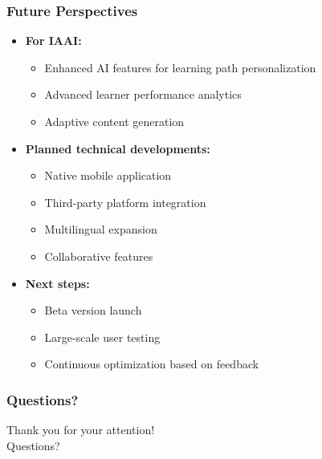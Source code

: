 \documentclass{beamer}
\begin{document}
\begin{frame}
\frametitle{Future Perspectives}
\begin{itemize}
    \item \textbf{For IAAI:}
    \begin{itemize}
        \item Enhanced AI features for learning path personalization
        \item Advanced learner performance analytics
        \item Adaptive content generation
    \end{itemize}
    \item \textbf{Planned technical developments:}
    \begin{itemize}
        \item Native mobile application
        \item Third-party platform integration
        \item Multilingual expansion
        \item Collaborative features
    \end{itemize}
    \item \textbf{Next steps:}
    \begin{itemize}
        \item Beta version launch
        \item Large-scale user testing
        \item Continuous optimization based on feedback
    \end{itemize}
\end{itemize}
\end{frame}

\begin{frame}
\frametitle{Questions?}
\begin{center}
    \LARGE Thank you for your attention!\\
    \vspace{1cm}
    Questions?
\end{center}
\end{frame}
\end{document}
